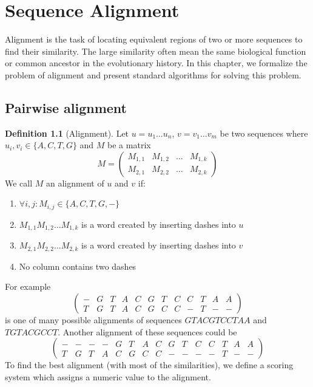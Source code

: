 \chapter{Sequence Alignment}

\label{kap:alignment} %

Alignment is the task of locating equivalent regions of two or more sequences to find their similarity.
The large similarity often mean the same biological function or common ancestor in the evolutionary history.
In this chapter, we formalize the problem of alignment and present standard algorithms for
solving this problem.

\section{Pairwise alignment}

\theoremstyle{definition}
\newtheorem{definition}{Definition}[section]
\theoremstyle{definition}
\begin{definition}[Alignment]
Let $u=u_1 \dots u_n$, $v=v_1 \dots v_m$ be two sequences where $u_i,v_i\in \{A, C, T, G\}$ and $M$ be a matrix
$$M=
\begin{pmatrix}
  M_{1,1} & M_{1,2} & \dots & M_{1,k} \\
  M_{2,1} & M_{2,2} & \dots & M_{2,k}
\end{pmatrix}$$
We call $M$ an alignment of $u$ and $v$ if:
\begin{enumerate}
\item $\forall i,j : M_{i,j}\in \{A,C,T,G,-\}$
\item $M_{1,1} M_{1,2} \dots M_{1,k}$ is a word created by inserting dashes into $u$
\item $M_{2,1} M_{2,2} \dots M_{2,k}$ is a word created by inserting dashes into $v$
\item No column contains two dashes
\end{enumerate}
\end{definition}

For example 
\setlength{\arraycolsep}{1pt}
\setcounter{MaxMatrixCols}{20}
$$
\begin{pmatrix}
   - & G & T & A & C & G & T & C & C & T & A & A \\
   T & G & T & A & C & G & C & C & - & T & - & -
\end{pmatrix}$$
is one  of many possible alignments of sequences $GTACGTCCTAA$ and $TGTACGCCT$.
Another alignment of these sequences could be 
$$\begin{pmatrix}
   -&-&-&-&G&T&A&C&G&T&C&C&T&A&A \\
   T&G&T&A&C&G&C&C&-&-&-&-&T&-&-
\end{pmatrix}$$
To find the best alignment (with most of the similarities), we define a scoring system which assigns a numeric value to the alignment.

